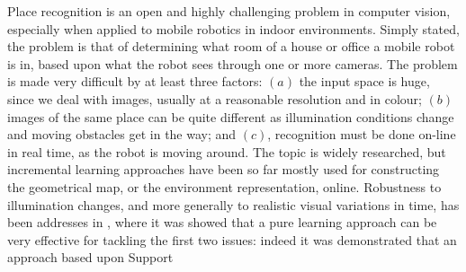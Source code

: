 Place recognition is an open and highly challenging problem in
computer vision, especially when applied to mobile robotics in indoor
environments. Simply stated, the problem is that of determining what
room of a house or office a mobile robot is in, based upon what the
robot sees through one or more cameras. The problem is made very
difficult by at least three factors: $(a)$ the input space is huge,
since we deal with images, usually at a reasonable resolution and in
colour; $(b)$ images of the same place can be quite different as
illumination conditions change and moving obstacles get in the way;
and $(c)$, recognition must be done on-line in real time, as the robot
is moving around.
The topic is  widely researched, but
incremental learning approaches have been so far mostly used for constructing the
geometrical map, or the environment representation, online\cite{emma:irca05, ljubjiana:icra02}.
Robustness to illumination changes, and more generally to realistic
visual variations in time, has been addresses in \cite{pronobis:iros06}, where it was showed that
a pure learning approach can be very effective 
for tackling the first two
issues: indeed it was demonstrated that an approach based upon Support
